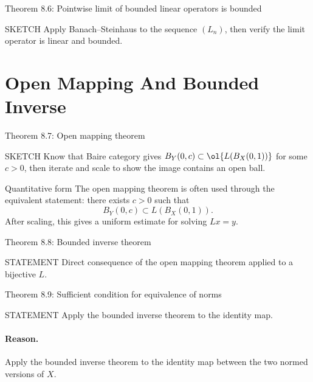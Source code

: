 \documentclass[header={Lecture 6 Exam Study Notes}]{study-note}
\begin{document}
\begin{thmbox}{Theorem 8.6: Pointwise limit of bounded linear operators is bounded}
\thmLimitOperatorBounded
\end{thmbox}

\begin{prooflevelbox}{SKETCH}
Apply Banach--Steinhaus to the sequence $(L_n)$, then verify the limit operator is linear and bounded.
\end{prooflevelbox}

\section{Open Mapping And Bounded Inverse}

\begin{thmbox}{Theorem 8.7: Open mapping theorem}
\thmOpenMapping
\end{thmbox}

\begin{prooflevelbox}{SKETCH}
Know that Baire category gives $B_Y(0,c)\subset \ol{L(B_X(0,1))}$ for some $c>0$, then iterate and scale to show the image contains an open ball.
\end{prooflevelbox}

\begin{exbox}{Quantitative form}
The open mapping theorem is often used through the equivalent statement:
there exists $c>0$ such that
\[
B_Y(0,c)\subset L(B_X(0,1)).
\]
After scaling, this gives a uniform estimate for solving $Lx=y$.
\end{exbox}

\begin{thmbox}{Theorem 8.8: Bounded inverse theorem}
\thmBoundedInverse
\end{thmbox}

\begin{prooflevelbox}{STATEMENT}
Direct consequence of the open mapping theorem applied to a bijective $L$.
\end{prooflevelbox}

\begin{thmbox}{Theorem 8.9: Sufficient condition for equivalence of norms}
\thmComparableNorms
\end{thmbox}

\begin{prooflevelbox}{STATEMENT}
Apply the bounded inverse theorem to the identity map.
\end{prooflevelbox}

\paragraph{Reason.}
Apply the bounded inverse theorem to the identity map between the two normed versions of $X$.
\end{document}
